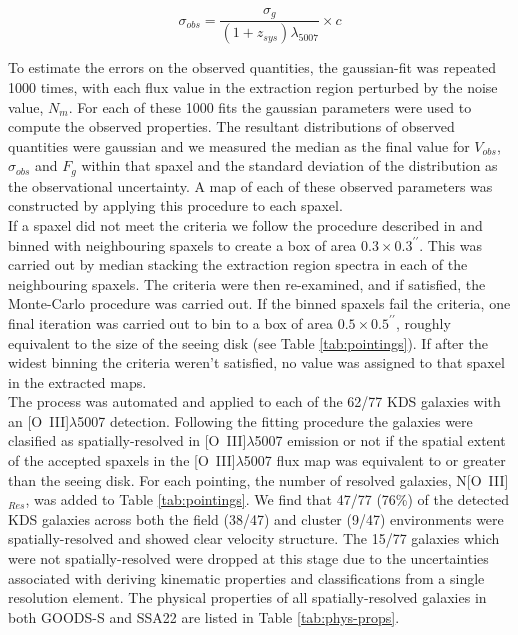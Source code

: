 \documentclass[fleqn,usenatbib]{mnras}
\begin{document}
\begin{equation}\label{eq:dispersion_comp}
   \sigma_{obs} = \frac{\sigma_{g}}{(1 + z_{sys})\lambda_{5007}} \times c
\end{equation}

\noindent
To estimate the errors on the observed quantities, the gaussian-fit was repeated 1000 times, with each flux value in the extraction region perturbed by the noise value, $N_{m}$.
For each of these 1000 fits the gaussian parameters were used to compute the observed properties.
The resultant distributions of observed quantities were gaussian and we measured the median as the final value for $V_{obs}$, $\sigma_{obs}$ and $F_{g}$ within that spaxel and the standard deviation of the distribution as the observational uncertainty.
A map of each of these observed parameters was constructed by applying this procedure to each spaxel. \\

\noindent
If a spaxel did not meet the criteria we follow the procedure described in \cite{Stott2016} and binned with neighbouring spaxels to create a box of area $0.3\times0.3^{\prime\prime}$.
This was carried out by median stacking the extraction region spectra in each of the neighbouring spaxels.
The criteria were then re-examined, and if satisfied, the Monte-Carlo procedure was carried out. 
If the binned spaxels fail the criteria, one final iteration was carried out to bin to a box of area $0.5\times0.5^{\prime\prime}$, roughly equivalent to the size of the seeing disk (see Table \ref{tab:pointings}).
If after the widest binning the criteria weren't satisfied, no value was assigned to that spaxel in the extracted maps. \\

\noindent
The process was automated and applied to each of the 62/77 KDS galaxies with an [O~{\sc III}]$\lambda$5007 detection.
Following the fitting procedure the galaxies were clasified as spatially-resolved in [O~{\sc III}]$\lambda$5007 emission or not if the spatial extent of the accepted spaxels in the [O~{\sc III}]$\lambda$5007 flux map was equivalent to or greater than the seeing disk.
For each pointing, the number of resolved galaxies, N[O~{\sc III}]$_{Res}$, was added to Table \ref{tab:pointings}.
We find that 47/77 (76\%) of the detected KDS galaxies across both the field (38/47) and cluster (9/47) environments were spatially-resolved and showed clear velocity structure.
The 15/77 galaxies which were not spatially-resolved were dropped at this stage due to the uncertainties associated with deriving kinematic properties and classifications from a single resolution element.
The physical properties of all spatially-resolved galaxies in both GOODS-S and SSA22 are listed in Table \ref{tab:phys-props}. \\ 
\end{document}
